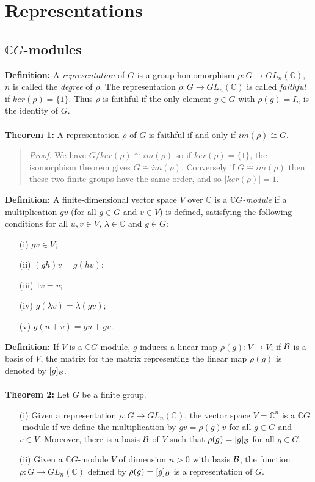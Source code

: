 \chapter{Representations}
\section {${\mathbb C}G$-modules}
{\bf Definition:} A \emph{representation} of $G$ is a group
homomorphism $\rho: G \rightarrow GL_n({\mathbb C})$, 
$n$ is called the \emph{degree} of $\rho$.
The representation $\rho: G \rightarrow GL_n({\mathbb C})$ is
called \emph{faithful} if $ker(\rho) =\{1\}$.
Thus $\rho$ is faithful if the only element $g\in G$ with $\rho(g)=I_n$ is the
identity of $G$. 
\\
\\
{\bf Theorem 1:} A representation $\rho$ of $G$ is faithful if
and only if $im(\rho) \cong G$.
\begin{quote}
\emph{Proof:}
We have $G/ker(\rho) \cong im(\rho)$ so if $ker(\rho)=\{1\}$, the
isomorphism theorem gives 
$G \cong im(\rho)$.
Conversely if $G \cong im(\rho)$ then these two finite groups
have the same order, and so $|ker(\rho)|=1$.
\end{quote}
{\bf Definition:} A finite-dimensional vector space $V$ over ${\mathbb C}$ is a
\emph{${\mathbb C}G$-module} if a multiplication $gv$ (for all $g\in G$ and $v\in V$) is
defined, satisfying the following conditions for all
$u,v\in V$, $\lambda \in {\mathbb C}$ and $g \in G$:
\begin{itemize}
\item[(i)] $gv\in V$;
\item[(ii)] $(gh)v=g(hv)$;
\item[(iii)] $1v=v$;
\item[(iv)] $g(\lambda v)=\lambda(gv)$;
\item[(v)] $g(u+v)=gu+gv$.
\end{itemize}
{\bf Definition:}
If $V$ is a ${\mathbb C}G$-module, $g$ induces a linear map
$\rho(g): V \rightarrow V$;
if ${\cal B}$ is a basis of $V$, the matrix for the matrix representing the linear
map $\rho(g)$ is denoted by $[g]_{\cal B}$.
\\
\\
{\bf Theorem 2:} Let $G$ be a finite group.
\begin{itemize}
\item[(i)] Given a representation
$\rho: G \rightarrow GL_n({\mathbb C})$, the vector space $V= {\mathbb C}^n$ is a
${\mathbb C}G$-module
if we define the multiplication by $gv=\rho(g)v$ for all $g\in G$ and
$v \in V$. Moreover, there is a basis ${\cal B}$ of $V$ such that
$\rho(g)=[g]_{\cal B}$ for all $g\in G$.
\item[(ii)] Given a ${\mathbb C}G$-module $V$ of dimension $n>0$ with basis ${\cal B}$, the
function $\rho: G \rightarrow GL_n({\mathbb C})$ defined by $\rho(g)=[g]_{\cal B}$ is a
representation of $G$.
\end{itemize}
